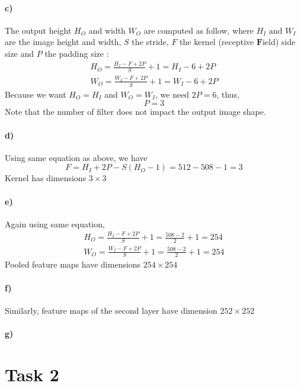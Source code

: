 \documentclass{article}
\begin{document}
		\paragraph{c)} 
		The output height $H_O$ and width $W_O$ are computed as follow, where $H_I \text{ and } W_I $ are the image height and width, $S$ the stride, $F$ the kernel (receptive $\textbf{F}$ield) side size and $P$ the padding size  : 
		\[
		\begin{aligned}
			H_O = \frac{H_I - F + 2P}{S} + 1 = H_I - 6 + 2P\\
			W_O = \frac{W_I - F + 2P}{S} + 1 = W_I - 6 + 2P 			
		\end{aligned}
		\]
		Because we want $H_O = H_I$ and $W_O = W_I$, we need $2P = 6$, thus, 
		$$ P = 3$$
		Note that the number of filter does not impact the output image shape.
		
		\paragraph{d)}
		Using same equation as above, we have
		\[
		F = H_I + 2P - S(H_O - 1) = 512 - 508 - 1 = 3
		\]
		Kernel has dimensions $ 3 \times 3 $
		
		\paragraph{e)}
		Again using same equation,
		\[ 
		\begin{aligned}
		H_O = \frac{H_I - F + 2P}{S} + 1 = \frac{508 - 2}{2} + 1 = 254 \\
		W_O = \frac{W_I - F + 2P}{S} + 1 = \frac{508 - 2}{2} + 1 = 254
		\end{aligned}
		\]
		Pooled feature maps have dimensions $254 \times 254$
		
		\paragraph{f)}
		Similarly, feature maps of the second layer have dimension $252 \times 252$
		
		\paragraph{g)}
		
	\section*{Task 2}

	
\end{document}

